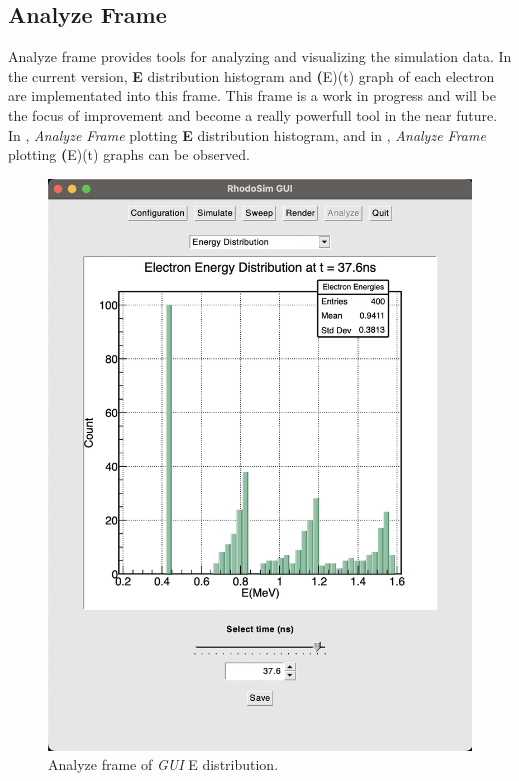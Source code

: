 \documentclass[a4paper,oneside,12pt]{report}
\numberwithin{equation}{chapter}
\begin{document}
\subsection{Analyze Frame}
Analyze frame provides tools for analyzing and visualizing the simulation data. 
In the current version, \textbf{E} distribution histogram and \textbf(E)(t) graph of each electron are implementated into this frame.
This frame is a work in progress and will be the focus of improvement and become a really powerfull tool in the near future.
In , \textit{Analyze Frame} plotting \textbf{E} distribution histogram, and in , \textit{Analyze Frame} plotting \textbf(E)(t) graphs can be observed.
\begin{figure}
    \centering
    \includegraphics[width=0.8\linewidth]{./figures/rhodoSim/GUI_analyze_Edist.png}
    \caption{Analyze frame of \textit{GUI} E distribution.}
    \label{fig:gui_analyze_Edist}
\end{figure}
\end{document}
